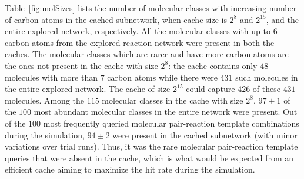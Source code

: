 Table~\ref{fig:molSizes} lists the number of molecular classes with increasing number of carbon atoms in the cached subnetwork, when cache size is $2^8$ and $2^{15}$, and the entire explored network, respectively. 
All the molecular classes with up to $6$ carbon atoms from the explored reaction network were present in both the caches. The molecular classes which are rarer and have more carbon atoms are the ones not present in the cache with size $2^8$: the cache contains only $48$ molecules with more than $7$ carbon atoms while there were $431$ such molecules in the entire explored network. The cache of size $2^{15}$ could capture $426$ of these $431$ molecules. Among the $115$ molecular classes in the cache with size $2^8$, $97\pm1$ of the $100$ most abundant molecular classes in the entire network were present. Out of the $100$ most frequently queried molecular pair-reaction template combinations during the simulation, $94\pm2$ were present in the cached subnetwork (with minor variations over trial runs). Thus, it was the rare molecular pair-reaction template queries that were absent in the cache, which is what would be expected from an efficient cache aiming to maximize the hit rate during the simulation.  
